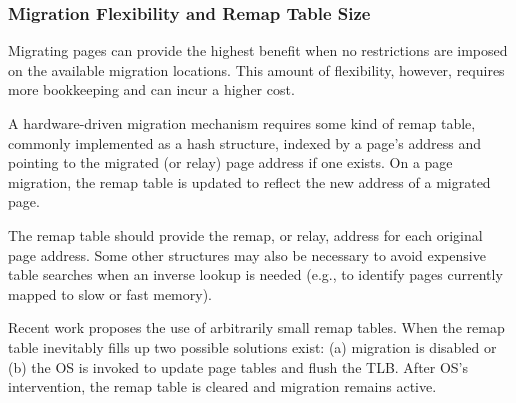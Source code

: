 \subsubsection{Migration Flexibility and Remap Table Size}
\label{sec:relocation}

Migrating pages can provide the highest benefit when no restrictions are imposed on the available migration locations.  This amount of flexibility, however,
requires more bookkeeping and can incur a higher cost.

A hardware-driven migration mechanism requires some kind of remap table,
commonly implemented as a hash structure, indexed by a page's address and pointing to the migrated (or relay) page address if one exists. On a page migration, the remap table is updated to reflect the new address of a migrated page. 

The remap table should provide the remap, or relay, address for each original
page address.  Some other structures may also be necessary to avoid expensive
table searches when an inverse lookup is needed (e.g., to identify pages
currently mapped to slow or fast memory).

Recent work \cite{ramos-small-rt} proposes the use of arbitrarily small remap tables. When the remap table inevitably fills up two possible solutions exist: (a) migration is disabled or (b) the OS is invoked to update page tables and flush the TLB. After OS's intervention, the remap table is cleared and migration remains active.

